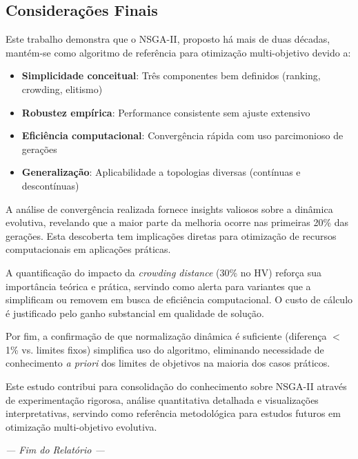 \subsection{Considerações Finais}

Este trabalho demonstra que o NSGA-II, proposto há mais de duas décadas, mantém-se como algoritmo de referência para otimização multi-objetivo devido a:

\begin{itemize}
    \item \textbf{Simplicidade conceitual}: Três componentes bem definidos (ranking, crowding, elitismo)
    \item \textbf{Robustez empírica}: Performance consistente sem ajuste extensivo
    \item \textbf{Eficiência computacional}: Convergência rápida com uso parcimonioso de gerações
    \item \textbf{Generalização}: Aplicabilidade a topologias diversas (contínuas e descontínuas)
\end{itemize}

A análise de convergência realizada fornece insights valiosos sobre a dinâmica evolutiva, revelando que a maior parte da melhoria ocorre nas primeiras 20\% das gerações. Esta descoberta tem implicações diretas para otimização de recursos computacionais em aplicações práticas.

A quantificação do impacto da \textit{crowding distance} (30\% no HV) reforça sua importância teórica e prática, servindo como alerta para variantes que a simplificam ou removem em busca de eficiência computacional. O custo de cálculo é justificado pelo ganho substancial em qualidade de solução.

Por fim, a confirmação de que normalização dinâmica é suficiente (diferença $<$ 1\% vs. limites fixos) simplifica uso do algoritmo, eliminando necessidade de conhecimento \textit{a priori} dos limites de objetivos na maioria dos casos práticos.

Este estudo contribui para consolidação do conhecimento sobre NSGA-II através de experimentação rigorosa, análise quantitativa detalhada e visualizações interpretativas, servindo como referência metodológica para estudos futuros em otimização multi-objetivo evolutiva.

\vspace{1cm}

\begin{center}
\textit{--- Fim do Relatório ---}
\end{center}
